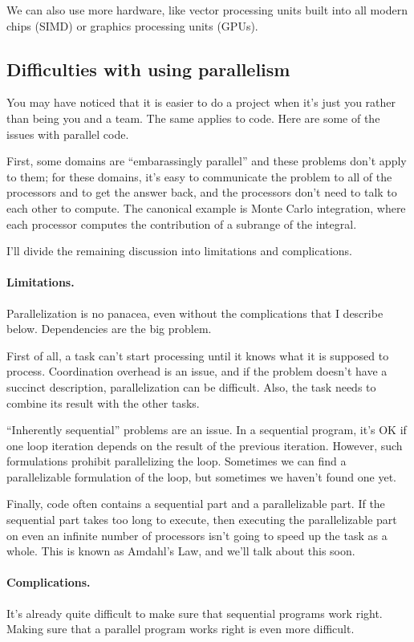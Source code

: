 We can also use more hardware, like vector processing units built into all modern
chips (SIMD) or graphics processing units (GPUs).

\subsection*{Difficulties with using parallelism}
You may have noticed that it is easier to do a project when it's just
you rather than being you and a team. The same applies to code.
Here are some of the issues with parallel code.

First, some domains are ``embarassingly parallel'' and these problems
don't apply to them; for these domains, it's easy to communicate
the problem to all of the processors and to get the answer back, and
the processors don't need to talk to each other to compute. The canonical
example is Monte Carlo integration, where each processor computes the
contribution of a subrange of the integral.

I'll divide the remaining discussion into limitations and complications.

\paragraph{Limitations.} Parallelization is no panacea, even without
the complications that I describe below. Dependencies are the
big problem.

First of all, a task can't start processing until it knows what it
is supposed to process. Coordination overhead is an issue, and if the
problem doesn't have a succinct description, parallelization can be
difficult. Also, the task needs to combine its result with the other
tasks.

``Inherently sequential'' problems are an issue. In a sequential 
program, it's OK if one loop iteration depends on the result of the
previous iteration. However, such formulations prohibit parallelizing
the loop. Sometimes we can find a parallelizable formulation of the loop,
but sometimes we haven't found one yet.

Finally, code often contains a sequential part and a parallelizable
part.  If the sequential part takes too long to execute, then
executing the parallelizable part on even an infinite number of
processors isn't going to speed up the task as a whole. This is
known as Amdahl's Law, and we'll talk about this soon.

\paragraph{Complications.} It's already quite difficult to make sure that
sequential programs work right. Making sure that a parallel program
works right is even more difficult.

